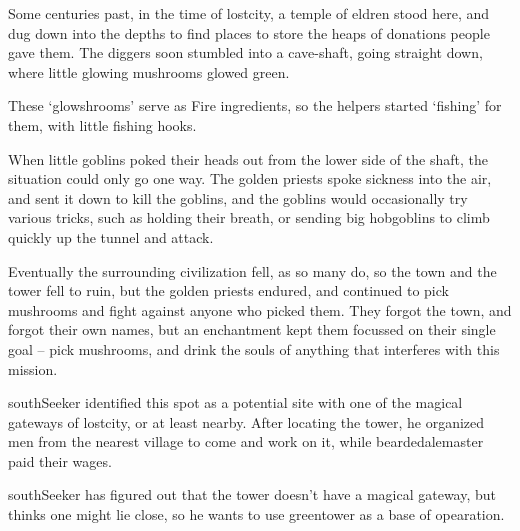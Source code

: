 


\begin{exampletext}
  Some centuries past, in the time of \gls{lostcity}, a temple of \gls{eldren} stood here, and dug down into the depths to find places to store the heaps of donations people gave them.
  The diggers soon stumbled into a cave-shaft, going straight down, where little glowing mushrooms glowed green.%

  These `glowshrooms' serve as Fire \glspl{ingredient}, so the \glspl{helper} started `fishing' for them, with little fishing hooks.

  When little goblins poked their heads out from the lower side of the shaft, the situation could only go one way.
  The golden priests spoke sickness into the air, and sent it down to kill the goblins, and the goblins would occasionally try various tricks, such as holding their breath, or sending big hobgoblins to climb quickly up the tunnel and attack.

  Eventually the surrounding civilization fell, as so many do, so the town and the tower fell to ruin, but the golden priests endured, and continued to pick mushrooms and fight against anyone who picked them.
  They forgot the town, and forgot their own names, but an enchantment kept them focussed on their single goal -- pick mushrooms, and drink the souls of anything that interferes with this mission.
\end{exampletext}

\begin{exampletext}
  \Gls{southSeeker} identified this spot as a potential site with one of the magical gateways of \gls{lostcity}, or at least nearby.
  After locating the tower, he organized men from the nearest \gls{village} to come and work on it, while \gls{beardedalemaster} paid their wages.

  \Gls{southSeeker} has figured out that the tower doesn't have a magical gateway, but thinks one might lie close, so he wants to use \gls{greentower} as a base of opearation.
\end{exampletext}

